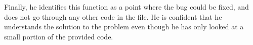 Finally, he identifies this function as a point where the bug could be fixed, and does not go through any other code in the file. 
He is confident that he understands the solution to the problem even though he has only looked at a small portion of the provided code. 





